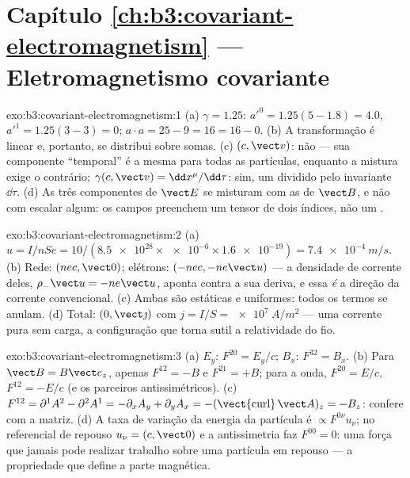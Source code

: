 \section*{Capítulo \ref{ch:b3:covariant-electromagnetism} --- Eletromagnetismo covariante}

\begin{solution}{exo:b3:covariant-electromagnetism:1}
(a) $\gamma = 1.25$: $a'^0 = 1.25(5 - 1.8) = 4.0$, $a'^1 = 1.25(3 -
3) = 0$; $a\cdot a = 25 - 9 = 16 = 16 - 0$. (b) A transformação é
linear e, portanto, se distribui sobre somas. (c) $(c, \vect v)$: não
--- sua componente ``temporal'' é a mesma para todas as partículas,
enquanto a mistura exige o contrário; $\gamma(c, \vect v) = \dd x^\mu/\dd\tau$:
sim, um  dividido pelo invariante $\dd\tau$. (d) As três
componentes de $\vect E$ se misturam com as de $\vect B$, e não com
escalar algum: os campos preenchem um tensor de dois índices, não um
.
\end{solution}

\begin{solution}{exo:b3:covariant-electromagnetism:2}
(a) $u = I/nSe = 10/(\num{8.5e28} \times \num{e-6} \times
\num{1.6e-19}) = \qty{7.4e-4}{m/s}$. (b) Rede: $(nec, \vect 0)$;
elétrons: $(-nec, -ne\vect u)$ --- a densidade de corrente deles,
$\rho_-\vect u = -ne\vect u$, aponta contra a sua deriva, e essa
\emph{é} a direção da corrente convencional. (c) Ambas são estáticas e uniformes: todos os termos se anulam. (d)
Total: $(0, \vect\jmath)$ com $j = I/S = \qty{e7}{A/m^2}$ --- uma
corrente pura sem carga, a configuração que torna sutil a relatividade
do fio.
\end{solution}

\begin{solution}{exo:b3:covariant-electromagnetism:3}
(a) $E_y$: $F^{20} = E_y/c$; $B_x$: $F^{32} = B_x$. (b) Para $\vect B
= B\vect e_z$, apenas $F^{12} = -B$ e $F^{21} = +B$; para a onda,
$F^{20} = E/c$, $F^{12} = -E/c$ (e os parceiros antissimétricos). (c)
$F^{12} = \partial^1A^2 - \partial^2A^1 = -\partial_xA_y +
\partial_yA_x = -(\operatorname{\vect{curl}}\vect A)_z = -B_z$:
confere com a matriz. (d) A taxa de variação da energia da partícula é
$\propto F^{0\nu}u_\nu$; no referencial de repouso $u_\nu = (c, \vect 0)$
e a antissimetria faz $F^{00} = 0$: uma força que jamais pode realizar
trabalho sobre uma partícula em repouso --- a propriedade que define a
parte magnética.
\end{solution}

